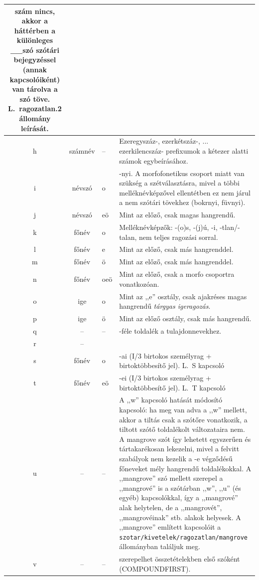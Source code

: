 \begin{longtable}[l]{cclp{12cm}}
szám nincs, akkor a háttérben a különleges \_\_szó szótári bejegyzéssel (annak kapcsolóiként)
van tárolva a szó töve. L.~ragozatlan.2 állomány leírását.
\\ \hline  h &  számnév & -- & Ezeregyszáz-, ezerkétszáz-, ... ezerkilencszáz- prefixumok a
kétezer alatti számok egybeírásához.
\\ \hline  i &  névszó & o & -nyi. A morfofonetikus csoport miatt van szükség a szétválasztásra,
mivel a többi melléknévképzővel ellentétben ez nem járul a nem szótári tövekhez
(bokrnyi, füvnyi).
\\ \hline  j &  névszó & eö & Mint az előző, csak magas hangrendű.
\\ \hline  k &  főnév & o & Melléknévképzők: -(o)s, -(j)ú, -i, -tlan/-talan,
nem teljes ragozási sorral.
\\ \hline  l &  főnév & e & Mint az előző, csak más hangrenddel.
\\ \hline  m &  főnév & ö & Mint az előző, csak más hangrenddel.
\\ \hline  n &  főnév & oeö & Mint az előző, csak a morfo csoportra vonatkozóan.
\\ \hline  o &  ige & o &  Mint az ,,e'' osztály, csak ajakréses magas hangrendű
\emph{tárgyas igeragozás}.
\\ \hline  p &  ige & ö &  Mint az előző osztály, csak más hangrendű.
\\ \hline  q & -- & -- & -féle toldalék a tulajdonnevekhez.
\\ \hline  r & --
\\ \hline  s & főnév & o & -ai (I/3 birtokos személyrag + birtoktöbbesítő jel). L.~S kapcsoló
\\ \hline  t & főnév & eö & -ei (I/3 birtokos személyrag + birtoktöbbesítő jel). L.~T kapcsoló
\\ \hline  u & -- & -- & A ,,w'' kapcsoló hatását módosító kapcsoló: ha meg van
adva a ,,w'' mellett, akkor a tiltás csak a szótőre vonatkozik, a tiltott szótő
toldalékolt változataira nem. A mangrove szót így lehetett egyszerűen és
tártakarékosan lekezelni, mivel a felvitt szabályok nem kezelik a -e végződésű főneveket
mély hangrendű toldalékokkal. A ,,mangrove'' szó mellett szerepel
a ,,mangrové'' is a szótárban ,,w'', ,,u'' (és egyéb) kapcsolókkal,
így a ,,mangrové'' alak helytelen, de a ,,mangrovét'', ,,mangrovéinak''
stb. alakok helyesek. A ,,mangrove'' említett kapcsolóit a
\texttt{szotar/kivetelek/ragozatlan/mangrove} állományban találjuk meg.
\\ \hline  v & -- & -- & szerepelhet összetételekben első szóként (COMPOUNDFIRST).

\end{longtable}
